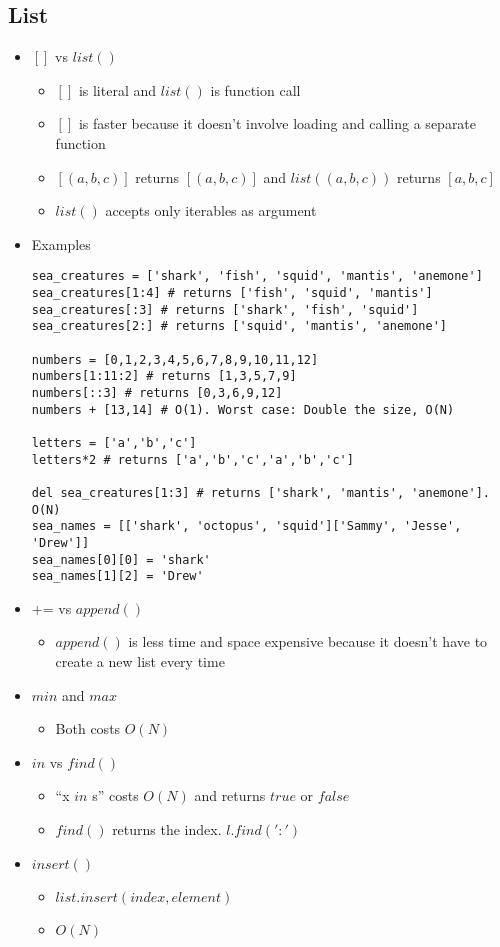 \documentclass[a4paper, 11.25pt]{article}
\begin{document}
\subsection{List}
\begin{itemize}
    \item $[]$ vs $list()$
    \begin{itemize}
        \item $[]$ is literal and $list()$ is function call
        \item $[]$ is faster because it doesn't involve loading and calling a separate function
        \item $[(a,b,c)]$ returns $[(a,b,c)]$ and $list((a,b,c))$ returns $[a,b,c]$
        \item $list()$ accepts only iterables as argument
    \end{itemize}
    \item Examples
    \begin{lstlisting}[style=PythonStyle]
sea_creatures = ['shark', 'fish', 'squid', 'mantis', 'anemone']
sea_creatures[1:4] # returns ['fish', 'squid', 'mantis']
sea_creatures[:3] # returns ['shark', 'fish', 'squid']
sea_creatures[2:] # returns ['squid', 'mantis', 'anemone']

numbers = [0,1,2,3,4,5,6,7,8,9,10,11,12]
numbers[1:11:2] # returns [1,3,5,7,9]
numbers[::3] # returns [0,3,6,9,12]
numbers + [13,14] # O(1). Worst case: Double the size, O(N)

letters = ['a','b','c']
letters*2 # returns ['a','b','c','a','b','c']

del sea_creatures[1:3] # returns ['shark', 'mantis', 'anemone']. O(N)
sea_names = [['shark', 'octopus', 'squid']['Sammy', 'Jesse', 'Drew']]
sea_names[0][0] = 'shark'
sea_names[1][2] = 'Drew'\end{lstlisting}
    \item += vs $append()$
    \begin{itemize}
        \item $append()$ is less time and space expensive because it doesn't have to create a new list every time
    \end{itemize}
    \item $min$ and $max$
    \begin{itemize}
        \item Both costs $O(N)$
    \end{itemize}
    \item $in$ vs $find()$
    \begin{itemize}
        \item ``x $in$ s'' costs $O(N)$ and returns $true$ or $false$
        \item $find()$ returns the index. $l.find( ':')$
    \end{itemize}
    \item $insert()$
    \begin{itemize}
        \item $list.insert(index, element)$
        \item $O(N)$
    \end{itemize}
\end{itemize}
\end{document}
